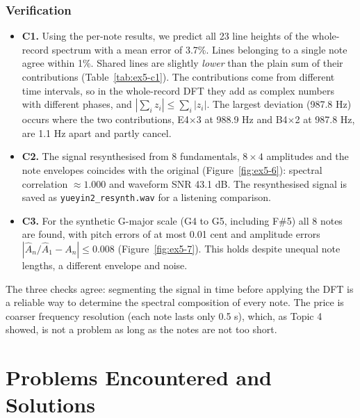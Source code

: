 \documentclass[12pt, a4paper]{article}
\begin{document}
\subsubsection{Verification}
\begin{itemize}
    \item \textbf{C1.} Using the per-note results, we predict all 23 line heights of the whole-record spectrum with a mean error of 3.7\%. Lines belonging to a single note agree within 1\%. Shared lines are slightly \emph{lower} than the plain sum of their contributions (Table~\ref{tab:ex5-c1}). The contributions come from different time intervals, so in the whole-record DFT they add as complex numbers with different phases, and $|\sum_i z_i|\le\sum_i|z_i|$. The largest deviation (987.8 Hz) occurs where the two contributions, E4$\times$3 at 988.9 Hz and B4$\times$2 at 987.8 Hz, are 1.1 Hz apart and partly cancel.
    \item \textbf{C2.} The signal resynthesised from 8 fundamentals, $8\times4$ amplitudes and the note envelopes coincides with the original (Figure~\ref{fig:ex5-6}): spectral correlation $\approx1.000$ and waveform SNR 43.1 dB. The resynthesised signal is saved as \texttt{yueyin2\_resynth.wav} for a listening comparison.
    \item \textbf{C3.} For the synthetic G-major scale (G4 to G5, including F\#5) all 8 notes are found, with pitch errors of at most 0.01 cent and amplitude errors $|\hat A_n/\hat A_1-A_n|\le0.008$ (Figure~\ref{fig:ex5-7}). This holds despite unequal note lengths, a different envelope and noise.
\end{itemize}
The three checks agree: segmenting the signal in time before applying the DFT is a reliable way to determine the spectral composition of every note. The price is coarser frequency resolution (each note lasts only 0.5 s), which, as Topic 4 showed, is not a problem as long as the notes are not too short.

\section{Problems Encountered and Solutions}
\end{document}

